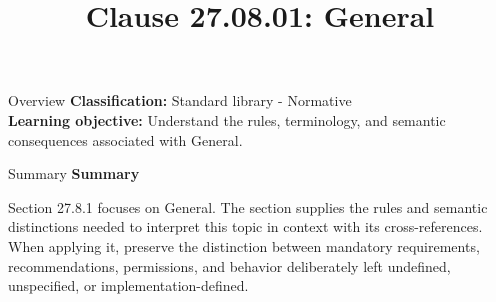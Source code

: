 \documentclass[10pt,letterpaper]{article}
\title{Clause 27.08.01: General}
\author{}
\date{}
\begin{document}
\maketitle
\begin{CornellOverviewBox}{Overview}
\textbf{Classification:} Standard library - Normative\\[2pt]
\textbf{Learning objective:} Understand the rules, terminology, and semantic consequences associated with General.
\end{CornellOverviewBox}\begin{CornellSummaryBox}{Summary}
{\sffamily\bfseries\color{Accent} Summary}\par\vspace{3pt}Section 27.8.1 focuses on General. The section supplies the rules and semantic distinctions needed to interpret this topic in context with its cross-references. When applying it, preserve the distinction between mandatory requirements, recommendations, permissions, and behavior deliberately left undefined, unspecified, or implementation-defined.
\end{CornellSummaryBox}
\end{document}
